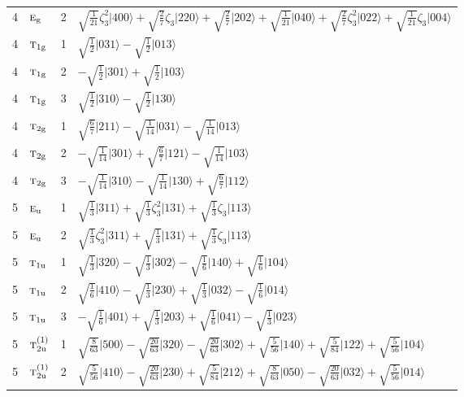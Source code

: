 \documentclass[11pt]{article}
\newcommand{\irr}[1]{\text{\normalfont\scshape #1}}
\newcommand{\ptag}[1]{\mathrm{#1}}
\newcommand{\rootunity}[1]{\zeta_{#1}}
\newcommand{\occ}[1]{\lvert #1\rangle}
\begin{document}
\begin{longtable}{c l c p{}}
4 & $\irr{e}_{\ptag{g}}$ & 2 & $\sqrt{\tfrac{1}{21}}\rootunity{3}^{2}\occ{400}+\sqrt{\tfrac{2}{7}}\rootunity{3}\occ{220}+\sqrt{\tfrac{2}{7}}\occ{202}+\sqrt{\tfrac{1}{21}}\occ{040}+\sqrt{\tfrac{2}{7}}\rootunity{3}^{2}\occ{022}+\sqrt{\tfrac{1}{21}}\rootunity{3}\occ{004}$\\
4 & $\irr{t}_{1\ptag{g}}$ & 1 & $\sqrt{\tfrac{1}{2}}\occ{031}-\sqrt{\tfrac{1}{2}}\occ{013}$\\
4 & $\irr{t}_{1\ptag{g}}$ & 2 & $-\sqrt{\tfrac{1}{2}}\occ{301}+\sqrt{\tfrac{1}{2}}\occ{103}$\\
4 & $\irr{t}_{1\ptag{g}}$ & 3 & $\sqrt{\tfrac{1}{2}}\occ{310}-\sqrt{\tfrac{1}{2}}\occ{130}$\\
4 & $\irr{t}_{2\ptag{g}}$ & 1 & $\sqrt{\tfrac{6}{7}}\occ{211}-\sqrt{\tfrac{1}{14}}\occ{031}-\sqrt{\tfrac{1}{14}}\occ{013}$\\
4 & $\irr{t}_{2\ptag{g}}$ & 2 & $-\sqrt{\tfrac{1}{14}}\occ{301}+\sqrt{\tfrac{6}{7}}\occ{121}-\sqrt{\tfrac{1}{14}}\occ{103}$\\
4 & $\irr{t}_{2\ptag{g}}$ & 3 & $-\sqrt{\tfrac{1}{14}}\occ{310}-\sqrt{\tfrac{1}{14}}\occ{130}+\sqrt{\tfrac{6}{7}}\occ{112}$\\
\hline
5 & $\irr{e}_{\ptag{u}}$ & 1 & $\sqrt{\tfrac{1}{3}}\occ{311}+\sqrt{\tfrac{1}{3}}\rootunity{3}^{2}\occ{131}+\sqrt{\tfrac{1}{3}}\rootunity{3}\occ{113}$\\
5 & $\irr{e}_{\ptag{u}}$ & 2 & $\sqrt{\tfrac{1}{3}}\rootunity{3}^{2}\occ{311}+\sqrt{\tfrac{1}{3}}\occ{131}+\sqrt{\tfrac{1}{3}}\rootunity{3}\occ{113}$\\
5 & $\irr{t}_{1\ptag{u}}$ & 1 & $\sqrt{\tfrac{1}{3}}\occ{320}-\sqrt{\tfrac{1}{3}}\occ{302}-\sqrt{\tfrac{1}{6}}\occ{140}+\sqrt{\tfrac{1}{6}}\occ{104}$\\
5 & $\irr{t}_{1\ptag{u}}$ & 2 & $\sqrt{\tfrac{1}{6}}\occ{410}-\sqrt{\tfrac{1}{3}}\occ{230}+\sqrt{\tfrac{1}{3}}\occ{032}-\sqrt{\tfrac{1}{6}}\occ{014}$\\
5 & $\irr{t}_{1\ptag{u}}$ & 3 & $-\sqrt{\tfrac{1}{6}}\occ{401}+\sqrt{\tfrac{1}{3}}\occ{203}+\sqrt{\tfrac{1}{6}}\occ{041}-\sqrt{\tfrac{1}{3}}\occ{023}$\\
5 & $\irr{t}_{2\ptag{u}}^{(1)}$ & 1 & $\sqrt{\tfrac{8}{63}}\occ{500}-\sqrt{\tfrac{20}{63}}\occ{320}-\sqrt{\tfrac{20}{63}}\occ{302}+\sqrt{\tfrac{5}{56}}\occ{140}+\sqrt{\tfrac{5}{84}}\occ{122}+\sqrt{\tfrac{5}{56}}\occ{104}$\\
5 & $\irr{t}_{2\ptag{u}}^{(1)}$ & 2 & $\sqrt{\tfrac{5}{56}}\occ{410}-\sqrt{\tfrac{20}{63}}\occ{230}+\sqrt{\tfrac{5}{84}}\occ{212}+\sqrt{\tfrac{8}{63}}\occ{050}-\sqrt{\tfrac{20}{63}}\occ{032}+\sqrt{\tfrac{5}{56}}\occ{014}$\\

\end{longtable}
\end{document}
